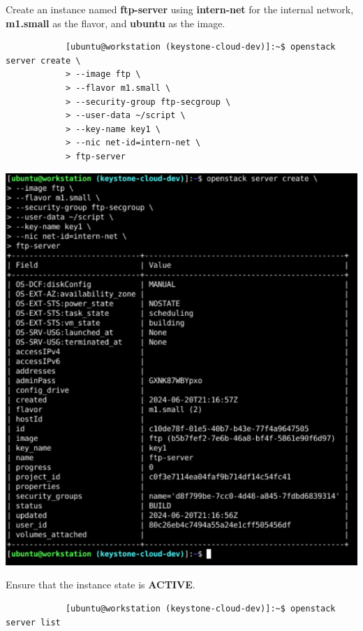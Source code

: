 \documentclass[letterpaper, 12pt]{article}
\begin{document}
\begin{enumerate}
    \begin{labstep}
        Create an instance named \textbf{ftp-server} using \textbf{intern-net} for the internal network,
        \textbf{m1.small} as the flavor, and \textbf{ubuntu} as the image.
        \begin{lstlisting}
            [ubuntu@workstation (keystone-cloud-dev)]:~$ openstack server create \
            > --image ftp \
            > --flavor m1.small \
            > --security-group ftp-secgroup \
            > --user-data ~/script \
            > --key-name key1 \
            > --nic net-id=intern-net \
            > ftp-server
        \end{lstlisting}

        \begin{center}
            \includegraphics[width=\linewidth]{images/part2/step1.png}
        \end{center}
    \end{labstep}

    \begin{labstep}
        Ensure that the instance state is \textbf{ACTIVE}.
        \begin{lstlisting}
            [ubuntu@workstation (keystone-cloud-dev)]:~$ openstack server list
        \end{lstlisting}


\end{labstep}
\end{enumerate}
\end{document}
